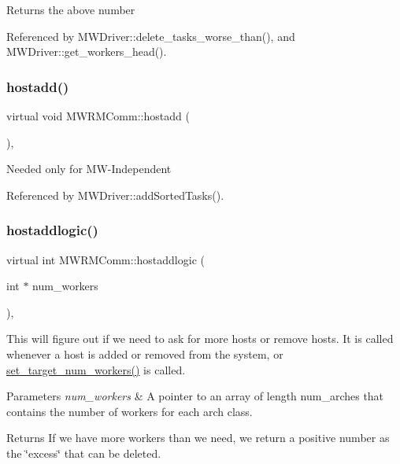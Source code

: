 Returns the above number 

Referenced by M\+W\+Driver\+::delete\+\_\+tasks\+\_\+worse\+\_\+than(), and M\+W\+Driver\+::get\+\_\+workers\+\_\+head().

\mbox{\label{classMWRMComm_a8cc7e0fa6b024fe7441fca581b4edf83}} 
\subsubsection{\texorpdfstring{hostadd()}{hostadd()}}
{\footnotesize\ttfamily virtual void M\+W\+R\+M\+Comm\+::hostadd (\begin{DoxyParamCaption}{ }\end{DoxyParamCaption})\hspace{0.3cm}{\ttfamily [inline]}, {\ttfamily [virtual]}}

Needed only for M\+W-\/\+Independent 

Referenced by M\+W\+Driver\+::add\+Sorted\+Tasks().

\mbox{\label{classMWRMComm_a4ded74716925e2213d6f898543491ce1}} 
\subsubsection{\texorpdfstring{hostaddlogic()}{hostaddlogic()}}
{\footnotesize\ttfamily virtual int M\+W\+R\+M\+Comm\+::hostaddlogic (\begin{DoxyParamCaption}\item[{int $\ast$}]{num\+\_\+workers }\end{DoxyParamCaption})\hspace{0.3cm}{\ttfamily [protected]}, {}}

This will figure out if we need to ask for more hosts or remove hosts. It is called whenever a host is added or removed from the system, or \hyperlink{classMWRMComm_a9723b0a13c493923e1282d7832b86b65}{set\+\_\+target\+\_\+num\+\_\+workers()} is called. 
\begin{DoxyParams}{Parameters}
{\em num\+\_\+workers} & A pointer to an array of length num\+\_\+arches that contains the number of workers for each arch class. \\
\hline
\end{DoxyParams}
\begin{DoxyReturn}{Returns}
If we have more workers than we need, we return a positive number as the \char`\"{}excess\char`\"{} that can be deleted. 
\end{DoxyReturn}


